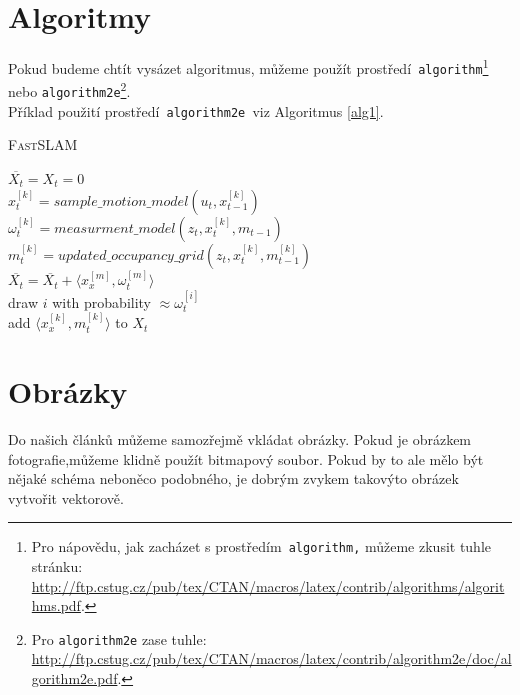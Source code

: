 \documentclass[11pt]{article}
\begin{document}


\section{Algoritmy} \label{sek3}

Pokud budeme chtít vysázet algoritmus, můžeme použít prostředí\texttt{ algorithm}\footnote{Pro nápovědu, jak zacházet s prostředím\texttt{ algorithm,} můžeme zkusit tuhle stránku: \\
\url{http://ftp.cstug.cz/pub/tex/CTAN/macros/latex/contrib/algorithms/algorithms.pdf}.} nebo \texttt{algorithm2e}\footnote{Pro \texttt{algorithm2e} zase tuhle: \url{http://ftp.cstug.cz/pub/tex/CTAN/macros/latex/contrib/algorithm2e/doc/algorithm2e.pdf}.}.\\
Příklad použití prostředí\texttt{ algorithm2e }viz Algoritmus \ref{alg1}.

\vspace{2em}

\begin{algorithm}[H]
    \label{alg1}
    \caption{\textsc{Fast}\uppercase{slam}}
    \SetNlSty{}{}{:}
    \SetInd{1em}{1em}
    \SetNlSkip{-1.4em}
    
    \Indp \Indp
    \BlankLine
    
    $\overline{X_{t}}=X_{t}=0$ \\
     {
        $x_{t}^{[k]} = sample\_motion\_model(u_{t}, x_{t-1}^{[k]})$ \\
        $\omega^{[k]}_{t} = measurment\_model(z_{t}, x_{t}^{[k]}, m_{t-1})$ \\
        $m^{[k]}_{t} = updated\_occupancy\_grid(z_{t}, x_{t}^{[k]}, m_{t-1}^{[k]})$ \\
        $\overline{X_{t}} = \overline{X_{t}} + \langle x_{x}^{[m]}, \omega^{[m]}_{t}\rangle$ \\
     }
     { 
        draw $i$ with probability $\approx \omega^{[i]}_{t}$   \\
        add $\langle x^{[k]}_{x},m^{[k]}_{t}\rangle$ to $X_{t}$
     }
\end{algorithm}

\vspace{1.5em}


\section{Obrázky}
Do našich článků můžeme samozřejmě vkládat obrázky. Pokud je obrázkem fotografie,můžeme klidně použít bitmapový soubor. Pokud by to ale mělo být nějaké schéma neboněco podobného, je dobrým zvykem takovýto obrázek vytvořit vektorově.
\end{document}
